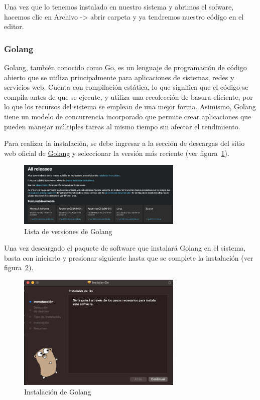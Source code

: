 Una vez que lo tenemos instalado en nuestro sistema y abrimos el sofware, hacemos clic en Archivo -> abrir carpeta y ya tendremos nuestro código en el editor.

\subsubsection{Golang}\label{golang}
Golang, también conocido como Go, es un lenguaje de programación de código abierto que se utiliza principalmente para aplicaciones de sistemas, redes y servicios web. Cuenta con compilación estática, lo que significa que el código se compila antes de que se ejecute, y utiliza una recolección de basura eficiente, por lo que los recursos del sistema se emplean de una mejor forma. Asimismo, Golang tiene un modelo de concurrencia incorporado que permite crear aplicaciones que pueden manejar múltiples tareas al mismo tiempo sin afectar el rendimiento. 

Para realizar la instalación, se debe ingresar a la sección de descargas del sitio web oficial de \href{https://go.dev/dl/}{Golang} y seleccionar la versión más reciente (ver figura~\ref{Img:Lista+de+versiones+de+Golang}).

\begin{figure}[h]
    \centering
    \includegraphics[width=0.7\textwidth]{img/manual/releases.png}
    \caption{Lista de versiones de Golang} \label{Img:Lista+de+versiones+de+Golang}
\end{figure} 

Una vez descargado el paquete de software que instalará Golang en el sistema, basta con iniciarlo y presionar siguiente hasta que se complete la instalación (ver figura~\ref{Img:Instalación+de+Golang}).

\begin{figure}[h]
    \centering
    \includegraphics[width=0.7\textwidth]{img/manual/instalacion.png}
    \caption{Instalación de Golang} \label{Img:Instalación+de+Golang}
\end{figure} 

